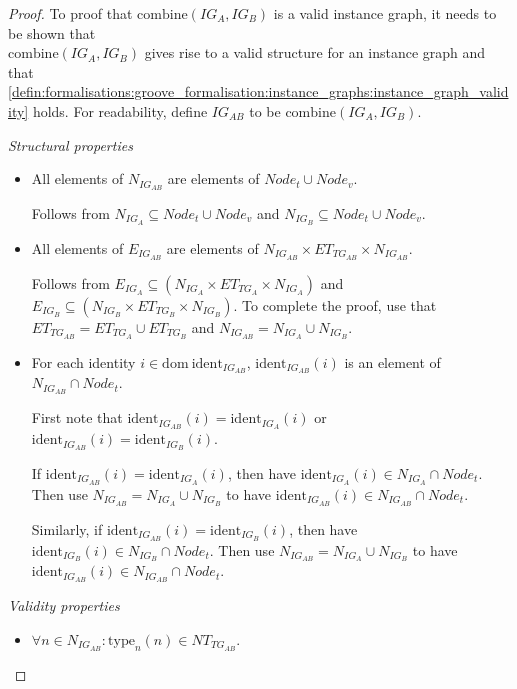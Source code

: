 \begin{proof}
To proof that $\mathrm{combine}(IG_A, IG_B)$ is a valid instance graph, it needs to be shown that\\ $\mathrm{combine}(IG_A, IG_B)$ gives rise to a valid structure for an instance graph and that \cref{defin:formalisations:groove_formalisation:instance_graphs:instance_graph_validity} holds. For readability, define $IG_{AB}$ to be $\mathrm{combine}(IG_A, IG_B)$.

\emph{Structural properties}
\begin{itemize}
    \item All elements of $N_{IG_{AB}}$ are elements of $Node_t \cup Node_v$.
    
    Follows from $N_{IG_{A}} \subseteq Node_t \cup Node_v$ and $N_{IG_{B}} \subseteq Node_t \cup Node_v$.
    
    
    \item All elements of $E_{IG_{AB}}$ are elements of $N_{IG_{AB}} \times ET_{TG_{AB}} \times N_{IG_{AB}}$.
    
    Follows from $E_{IG_{A}} \subseteq (N_{IG_{A}} \times ET_{TG_{A}} \times N_{IG_{A}})$ and $E_{IG_{B}} \subseteq (N_{IG_{B}} \times ET_{TG_{B}} \times N_{IG_{B}})$. To complete the proof, use that $ET_{TG_{AB}} = ET_{TG_{A}} \cup ET_{TG_{B}}$ and $N_{IG_{AB}} = N_{IG_{A}} \cup N_{IG_{B}}$.
    
    
    \item For each identity $i \in \mathrm{dom}\ \mathrm{ident}_{IG_{AB}}$, $\mathrm{ident}_{IG_{AB}}(i)$ is an element of $N_{IG_{AB}} \cap Node_t$.
    
    First note that $\mathrm{ident}_{IG_{AB}}(i) = \mathrm{ident}_{IG_{A}}(i)$ or $\mathrm{ident}_{IG_{AB}}(i) = \mathrm{ident}_{IG_{B}}(i)$. 
    
    If $\mathrm{ident}_{IG_{AB}}(i) = \mathrm{ident}_{IG_{A}}(i)$, then have $\mathrm{ident}_{IG_{A}}(i) \in N_{IG_{A}} \cap Node_t$. Then use $N_{IG_{AB}} = N_{IG_{A}} \cup N_{IG_{B}}$ to have $\mathrm{ident}_{IG_{AB}}(i) \in N_{IG_{AB}} \cap Node_t$.
    
    Similarly, if $\mathrm{ident}_{IG_{AB}}(i) = \mathrm{ident}_{IG_{B}}(i)$, then have $\mathrm{ident}_{IG_{B}}(i) \in N_{IG_{B}} \cap Node_t$. Then use $N_{IG_{AB}} = N_{IG_{A}} \cup N_{IG_{B}}$ to have $\mathrm{ident}_{IG_{AB}}(i) \in N_{IG_{AB}} \cap Node_t$.
\end{itemize}

\emph{Validity properties}
\begin{itemize}
    \item $\forall n \in N_{IG_{AB}}\!: \mathrm{type}_n(n) \in NT_{TG_{AB}}$.
    

\end{itemize}
\end{proof}

